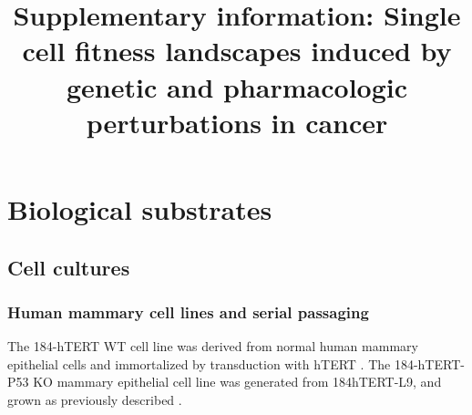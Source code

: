 \documentclass{article}
\title{Supplementary information: \newline Single cell fitness landscapes induced by genetic and pharmacologic perturbations in cancer}
\begin{document}
\maketitle


\tableofcontents

\renewcommand{\thefigure}{S\arabic{figure}}
\setcounter{figure}{0}

\section{Biological substrates} 
\subsection{Cell cultures}
\subsubsection{Human mammary cell lines and serial passaging}
The 184-hTERT WT cell line was derived from normal human mammary epithelial cells and immortalized by transduction with hTERT \cite{stampfer2003human}.
The 184-hTERT-P53 KO mammary epithelial cell line was generated from 184hTERT-L9, and grown as previously described \cite{laks2019clonal,burleigh2015co}. 
\end{document}
